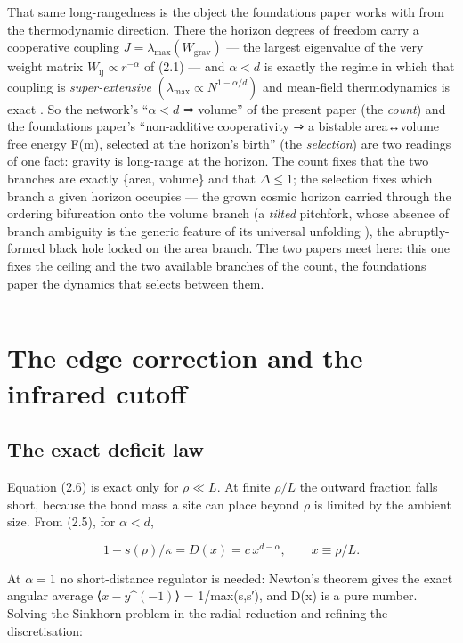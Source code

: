 \documentclass[12pt]{iopart}
\begin{document}
That same long-rangedness is the object the foundations paper works with
from the thermodynamic direction. There the horizon degrees of freedom
carry a cooperative coupling
\(J = \lambda _{\mathrm{max}}(W_{\mathrm{grav}})\) --- the largest
eigenvalue of the very weight matrix
\(W_{\mathrm{ij}} \propto  r^{-\alpha }\) of (2.1) --- and
\(\alpha  < d\) is exactly the regime in which that coupling is
\emph{super-extensive}
\((\lambda _{\mathrm{max}} \propto  N^{1-\alpha /d})\) and mean-field
thermodynamics is exact \citep{Campa:2009jxa}. So the network's
``\(\alpha  < d\) ⇒ volume'' of the present paper (the \emph{count}) and
the foundations paper's ``non-additive cooperativity ⇒ a bistable
area↔volume free energy F(m), selected at the horizon's birth'' (the
\emph{selection}) are two readings of one fact: gravity is long-range at
the horizon. The count fixes that the two branches are exactly \{area,
volume\} and that \(\Delta  \leq  1\); the selection fixes which branch
a given horizon occupies --- the grown cosmic horizon carried through
the ordering bifurcation onto the volume branch (a \emph{tilted}
pitchfork, whose absence of branch ambiguity is the generic feature of
its universal unfolding \citep{Golubitsky:1985}), the abruptly-formed
black hole locked on the area branch. The two papers meet here: this one
fixes the ceiling and the two available branches of the count, the
foundations paper the dynamics that selects between them.

\begin{center}\rule{0.5\linewidth}{0.5pt}\end{center}

\section{The edge correction and the infrared cutoff}\label{sec-5}

\subsection{The exact deficit law}\label{sec-5-1}

Equation (2.6) is exact only for \(\rho  \ll  L\). At finite \(\rho /L\)
the outward fraction falls short, because the bond mass a site can place
beyond \(\rho\) is limited by the ambient size. From (2.5), for
\(\alpha  < d\),

\[1 - s(\rho)/\kappa = D(x) = c\, x^{d-\alpha}, \qquad x \equiv \rho/L. \tag{5.1}\]

At \(\alpha  = 1\) no short-distance regulator is needed: Newton's
theorem gives the exact angular average
⟨\textbar{}\(x-y\)\textbar\^{}\((-1)\)⟩ = 1/max(s,s′), and D(x) is a
pure number. Solving the Sinkhorn problem in the radial reduction and
refining the discretisation:
\end{document}
